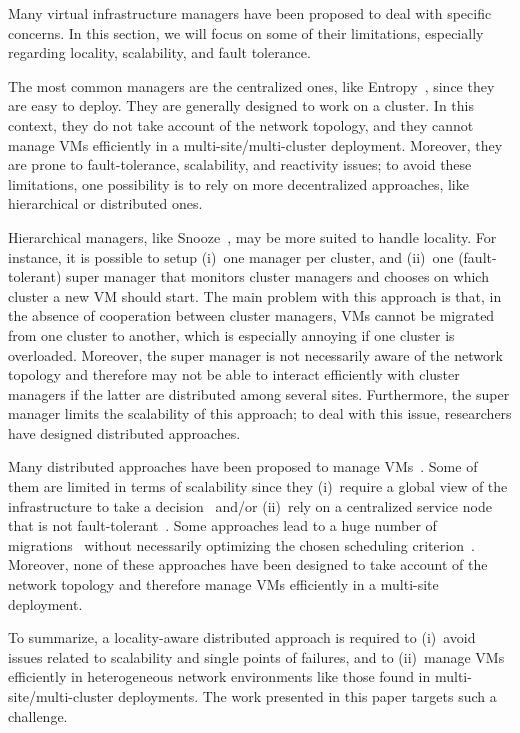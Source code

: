 

Many virtual infrastructure managers have been proposed to deal with specific concerns.
In this section, we will focus on some of their limitations, especially regarding
locality, scalability, and fault tolerance.

The most common managers are the centralized ones, like
Entropy~\cite{hermenier:cp11,hermenier:2013}, since they are easy to deploy.
%
They are generally designed to work on a cluster.
%
In this context, they do not take account of the network topology, and they
cannot manage VMs efficiently in a multi-site/multi-cluster deployment.
%
Moreover, they are prone to fault-tolerance, scalability, and reactivity issues; to avoid
these limitations, one possibility is to rely on more decentralized approaches, like
hierarchical or distributed ones.

Hierarchical managers, like Snooze~\cite{feller:ccgrid12}, may be more suited to handle
locality.
%
For instance, it is possible to setup (i)~one manager per cluster, and (ii)~one
(fault-tolerant) super manager that monitors cluster managers and chooses on which cluster
a new VM should start.
%
%
The main problem with this approach is that, in the absence of cooperation between cluster
managers, VMs cannot be migrated from one cluster to another, which is especially annoying
if one cluster is overloaded.
%
Moreover, the super manager is not necessarily aware of the network topology and therefore
may not be able to interact efficiently with cluster managers if the latter are
distributed among several sites.
%
Furthermore, the super manager limits the scalability of this approach; to deal with this
issue, researchers have designed distributed approaches.

Many distributed approaches have been proposed to manage
VMs~\cite{barbagallo:lncs10,feller:cloudcom12,marzolla:wowmom11,mastroianni:europar11,rouzaudcornabas:vhpc10,yazir:cloud10}.
%
Some of them are limited in terms of scalability since they (i)~require a global view of
the infrastructure to take a decision~\cite{rouzaudcornabas:vhpc10,yazir:cloud10} and/or
(ii)~rely on a centralized service node that is not
fault-tolerant~\cite{mastroianni:europar11,yazir:cloud10}.
%
Some approaches lead to a huge number of
migrations~\cite{barbagallo:lncs10,mastroianni:europar11} without necessarily optimizing
the chosen scheduling criterion~\cite{barbagallo:lncs10}.
%
Moreover, none of these approaches have been designed to take account of the network
topology and therefore manage VMs efficiently in a multi-site deployment.

To summarize, a locality-aware distributed approach is required to (i)~avoid issues
related to scalability and single points of failures, and to (ii)~manage VMs efficiently
in heterogeneous network environments like those found in multi-site/multi-cluster deployments.
The work presented in this paper targets such a challenge. 

